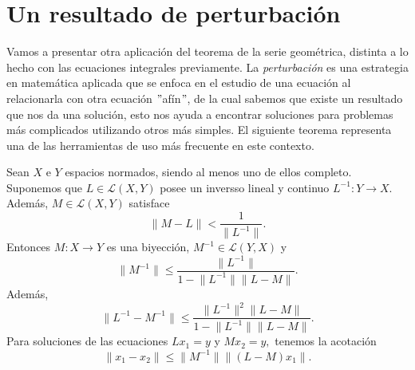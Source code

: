 \section{Un resultado de perturbación}
Vamos a presentar otra aplicación del teorema de la serie geométrica, distinta a lo hecho con las ecuaciones integrales previamente.
La \textit{perturbación} es una estrategia en matemática aplicada que se enfoca en el estudio de una ecuación al relacionarla con otra ecuación $"$afín$"$, de la cual sabemos que existe un resultado que nos da una solución, esto nos ayuda a encontrar soluciones para problemas más complicados utilizando otros más simples. El siguiente teorema representa una de las herramientas de uso más frecuente en este contexto.

\begin{teorema}
	Sean $X$ e $Y$ espacios normados, siendo al menos uno de ellos completo. Suponemos que $L \in \mathcal{L}(X,Y)$ posee un inversso lineal y continuo $L^{-1}: Y \rightarrow X.$ Además, $M \in \mathcal{L}(X,Y)$ satisface
	\begin{equation}\label{eq:teo7}
		\lVert M-L \rVert < \dfrac{1}{\lVert L^{-1} \rVert}.
	\end{equation}
	Entonces $M:X\rightarrow Y$ es una biyección, $M^{-1} \in \mathcal{L}(Y,X)$ y 
	\begin{equation}\label{eq:teo5}
		\lVert M^{-1} \rVert \leqslant \dfrac{\lVert L^{-1} \rVert}{1 - \lVert L^{-1} \rVert \lVert L-M \rVert}.
	\end{equation}
	Además,
	\begin{equation}\label{eq:teo4}
		\lVert L^{-1} - M^{-1} \rVert \leqslant \dfrac{\lVert L^{-1} \rVert^2 \lVert L-M \rVert}{1 - \lVert L^{-1} \rVert \lVert L-M \rVert}.
	\end{equation}
	Para soluciones de las ecuaciones $Lx_1 = y$ y $Mx_2 = y,$ tenemos la acotación
	\begin{equation}\label{eq:teo6}
		\lVert x_1 - x_2 \rVert \leqslant \lVert M^{-1} \rVert \lVert (L-M)x_1 \rVert.
	\end{equation}
\end{teorema}
